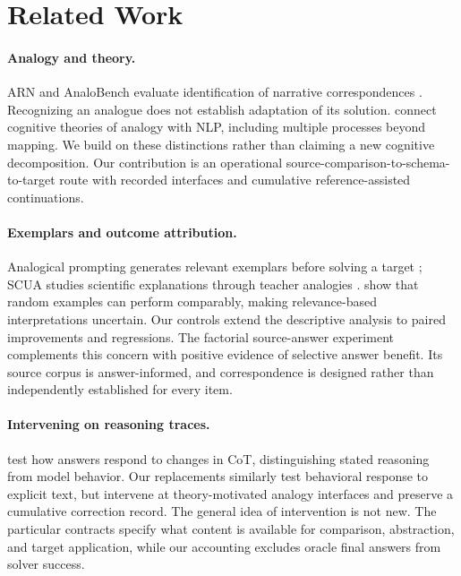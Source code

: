 \section{Related Work}
\label{sec:background}
\paragraph{Analogy and theory.}
ARN and AnaloBench evaluate identification of narrative correspondences \citep{sourati2024arn,ye2024analobench}. Recognizing an analogue does not establish adaptation of its solution. \citet{petersen2026modelling} connect cognitive theories of analogy with NLP, including multiple processes beyond mapping. We build on these distinctions rather than claiming a new cognitive decomposition. Our contribution is an operational source-comparison-to-schema-to-target route with recorded interfaces and cumulative reference-assisted continuations.

\paragraph{Exemplars and outcome attribution.}
Analogical prompting generates relevant exemplars before solving a target \citep{yasunaga2024analogical}; SCUA studies scientific explanations through teacher analogies \citep{yuan2024boosting}. \citet{qin2025relevant} show that random examples can perform comparably, making relevance-based interpretations uncertain. Our controls extend the descriptive analysis to paired improvements and regressions. The factorial source-answer experiment complements this concern with positive evidence of selective answer benefit. Its source corpus is answer-informed, and correspondence is designed rather than independently established for every item.

\paragraph{Intervening on reasoning traces.}
\citet{lanham2023faithfulness} test how answers respond to changes in CoT, distinguishing stated reasoning from model behavior. Our replacements similarly test behavioral response to explicit text, but intervene at theory-motivated analogy interfaces and preserve a cumulative correction record. The general idea of intervention is not new. The particular contracts specify what content is available for comparison, abstraction, and target application, while our accounting excludes oracle final answers from solver success.
